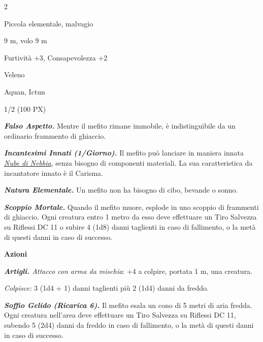 \begin{multicols}{2}
{
\begin{description}[noitemsep, topsep=0pt, parsep=0pt, partopsep=0pt, itemsep=1pt, leftmargin=2.35cm,  labelwidth=2.2cm, itemindent=0cm, listparindent=0pt] %
\setlength{\baselineskip}{10pt}
\item[\textbf{Taglia/Tipo}] Piccola elementale, malvagio
\item[\textbf{Caratt.}] 
\item[\textbf{Punti Ferita}] 
\item[\textbf{Movimento}] 9 m, volo 9 m
\item[\textbf{Tiri Salvez.}] 
\item[\textbf{Comp.}] Furtività +3, Consapevolezza +2
\item[\textbf{Imm. Danni}] Veleno
\item[\textbf{Sensi}] 
\item[\textbf{Linguaggi}] Aquan, Ictun
\item[\textbf{Sfida}] 1/2 (100 PX)
\end{description}
\smallskip

\emph{\textbf{Falso Aspetto.}} Mentre il mefito rimane immobile, è indistinguibile da un ordinario frammento di ghiaccio.

\emph{\textbf{Incantesimi Innati (1/Giorno).}} Il mefito può lanciare in maniera innata \emph{\hyperlink{Nube di Nebbia}{Nube di Nebbia}}, senza bisogno di componenti materiali. La sua caratteristica da incantatore innato è il Carisma.

\emph{\textbf{Natura Elementale.}} Un mefito non ha bisogno di cibo, bevande o sonno.

\emph{\textbf{Scoppio Mortale.}} Quando il mefito muore, esplode in uno scoppio di frammenti di ghiaccio. Ogni creatura entro 1 metro da esso deve effettuare un Tiro Salvezza su Riflessi DC 11 o subire 4 (1d8) danni taglienti in caso di fallimento, o la metà di questi danni in caso
di successo.

\textbf{Azioni}

\emph{\textbf{Artigli.} Attacco con arma da mischia}: +4 a colpire, portata 1 m, una creatura.

\emph{Colpisce:} 3 (1d4 + 1) danni taglienti più 2 (1d4) danni da freddo.

\emph{\textbf{Soffio Gelido (Ricarica 6).}} Il mefito esala un cono di 5 metri di aria fredda. Ogni creatura nell'area deve effettuare un Tiro Salvezza su Riflessi DC 11, subendo 5 (2d4) danni da freddo in caso di fallimento, o la metà di questi danni in caso di successo.

}
\end{multicols}
